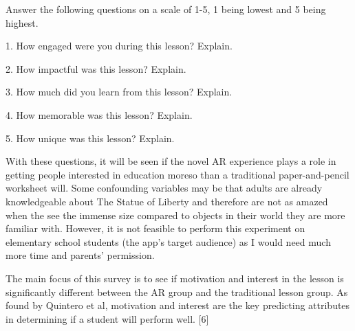 \documentclass{vgtc}                          %
\begin{document}
Answer the following questions on a scale of 1-5, 1 being lowest and 5 being highest.

1. How engaged were you during this lesson? Explain.

2. How impactful was this lesson? Explain.

3. How much did you learn from this lesson? Explain.

4. How memorable was this lesson? Explain.

5. How unique was this lesson? Explain.
\vspace*{4mm}

	With these questions, it will be seen if the novel AR experience plays a role in getting people interested in education moreso than a traditional paper-and-pencil worksheet will. Some confounding variables may be that adults are already knowledgeable about The Statue of Liberty and therefore are not as amazed when the see the immense size compared to objects in their world they are more familiar with. However, it is not feasible to perform this experiment on elementary school students (the app's target audience) as I would need much more time and parents' permission. 
\vspace*{4mm}

	The main focus of this survey is to see if motivation and interest in the lesson is significantly different between the AR group and the traditional lesson group. As found by Quintero et al, motivation and interest are the key predicting attributes in determining if a student will perform well. [6]


\end{document}
